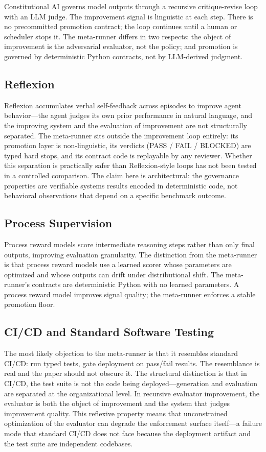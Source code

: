 \documentclass[11pt]{article}
\begin{document}
Constitutional AI \citep{bai2022} governs model outputs through a recursive critique-revise loop with an LLM judge. The improvement signal is linguistic at each step. There is no precommitted promotion contract; the loop continues until a human or scheduler stops it. The meta-runner differs in two respects: the object of improvement is the adversarial evaluator, not the policy; and promotion is governed by deterministic Python contracts, not by LLM-derived judgment.

\subsection{Reflexion}

Reflexion \citep{shinn2023} accumulates verbal self-feedback across episodes to improve agent behavior---the agent judges its own prior performance in natural language, and the improving system and the evaluation of improvement are not structurally separated. The meta-runner sits outside the improvement loop entirely: its promotion layer is non-linguistic, its verdicts (PASS / FAIL / BLOCKED) are typed hard stops, and its contract code is replayable by any reviewer. Whether this separation is practically safer than Reflexion-style loops has not been tested in a controlled comparison. The claim here is architectural: the governance properties are verifiable systems results encoded in deterministic code, not behavioral observations that depend on a specific benchmark outcome.

\subsection{Process Supervision}

Process reward models \citep{lightman2023} score intermediate reasoning steps rather than only final outputs, improving evaluation granularity. The distinction from the meta-runner is that process reward models use a learned scorer whose parameters are optimized and whose outputs can drift under distributional shift. The meta-runner's contracts are deterministic Python with no learned parameters. A process reward model improves signal quality; the meta-runner enforces a stable promotion floor.

\subsection{CI/CD and Standard Software Testing}

The most likely objection to the meta-runner is that it resembles standard CI/CD: run typed tests, gate deployment on pass/fail results. The resemblance is real and the paper should not obscure it. The structural distinction is that in CI/CD, the test suite is not the code being deployed---generation and evaluation are separated at the organizational level. In recursive evaluator improvement, the evaluator is both the object of improvement and the system that judges improvement quality. This reflexive property means that unconstrained optimization of the evaluator can degrade the enforcement surface itself---a failure mode that standard CI/CD does not face because the deployment artifact and the test suite are independent codebases.
\end{document}
